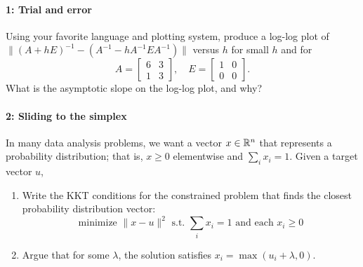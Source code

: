 \documentclass[12pt, leqno]{article} %
\begin{document}

\paragraph*{1: Trial and error}
Using your favorite language and plotting system, produce a log-log
plot of $\|(A+hE)^{-1}-(A^{-1}-h A^{-1} E A^{-1})\|$ versus $h$ for
small $h$ and for
\[
  A = \begin{bmatrix} 6 & 3 \\ 1 & 3 \end{bmatrix}, \quad
  E = \begin{bmatrix} 1 & 0 \\ 0 & 0 \end{bmatrix}.
\]
What is the asymptotic slope on the log-log plot, and why?  

\paragraph*{2: Sliding to the simplex}
In many data analysis problems, we want a vector $x \in \mathbb{R}^n$ that
represents a probability distribution; that is, $x \geq 0$ elementwise
and $\sum_i x_i = 1$.  Given a target vector $u$,
\begin{enumerate}
\item Write the KKT conditions for the constrained problem that finds
  the closest probability distribution vector:
\[
  \mbox{minimize } \|x-u\|^2
  \mbox{ s.t. } \sum_i x_i = 1
  \mbox{ and each } x_i \geq 0
\]
\item
  Argue that for some $\lambda$, the solution
  satisfies $x_i = \max(u_i + \lambda, 0)$.
\end{enumerate}
\end{document}
